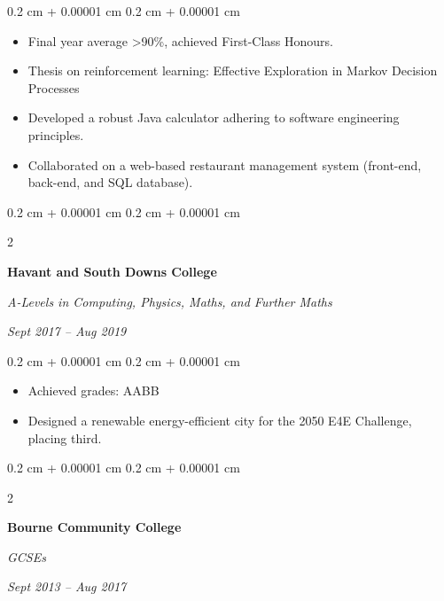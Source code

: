 \documentclass[10pt, letterpaper]{article}
\newenvironment{highlights}{
    \begin{itemize}[
        topsep=0.10 cm,
        parsep=0.10 cm,
        partopsep=0pt,
        itemsep=0pt,
        leftmargin=0.4 cm + 10pt
    ]
}{
    \end{itemize}
} %
\newenvironment{onecolentry}{
    \begin{adjustwidth}{
        0.2 cm + 0.00001 cm
    }{
        0.2 cm + 0.00001 cm
    }
}{
    \end{adjustwidth}
} %
\newenvironment{twocolentry}[2][]{
    \onecolentry
    \def\secondColumn{#2}
    \setcolumnwidth{\fill, 4.5 cm}
    \begin{paracol}{2}
}{
    \switchcolumn \raggedleft \secondColumn
    \end{paracol}
    \endonecolentry
} %
\begin{document}
        \vspace{0.10 cm}
        \begin{onecolentry}
            \begin{highlights}
                \item Final year average \textgreater 90\%, achieved First-Class Honours.
                \item Thesis on reinforcement learning: Effective Exploration in Markov Decision Processes
                \item Developed a robust Java calculator adhering to software engineering principles.
                \item Collaborated on a web-based restaurant management system (front-end, back-end, and SQL database).
            \end{highlights}
        \end{onecolentry}


        \vspace{0.2 cm}

        \begin{twocolentry}{
            
            
        \textit{Sept 2017 – Aug 2019}}
            \textbf{Havant and South Downs College}

            \textit{A-Levels in Computing, Physics, Maths, and Further Maths}
        \end{twocolentry}

        \vspace{0.10 cm}
        \begin{onecolentry}
            \begin{highlights}
                \item Achieved grades: AABB
                \item Designed a renewable energy-efficient city for the 2050 E4E Challenge, placing third.
            \end{highlights}
        \end{onecolentry}


        \vspace{0.2 cm}

        \begin{twocolentry}{
            
            
        \textit{Sept 2013 – Aug 2017}}
            \textbf{Bourne Community College}

            \textit{GCSEs}
        \end{twocolentry}
\end{document}
